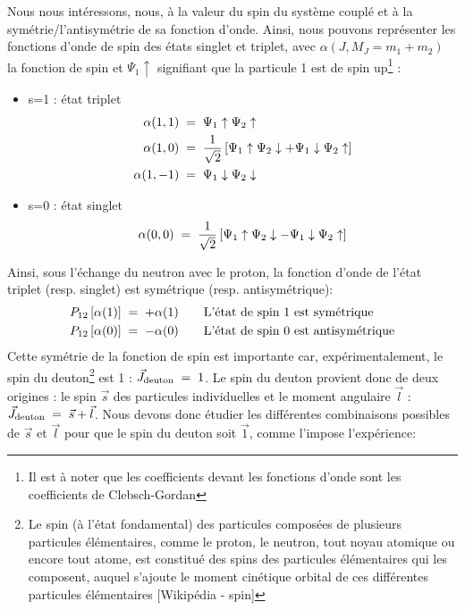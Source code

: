 Nous nous intéressons, nous, à la valeur du spin du système couplé et à la symétrie/l'antisymétrie de sa fonction d'onde. Ainsi, nous pouvons représenter les fonctions d'onde de spin des états singlet et triplet, avec $\alpha(J,M_J=m_1+m_2)$ la fonction de spin et $\Psi_1\uparrow$ signifiant que la particule 1 est de spin up\footnote{Il est à noter que les coefficients devant les fonctions d'onde sont les coefficients de Clebsch-Gordan} :
\begin{itemize}
    \item s=1 : état triplet
    \begin{align*}
        \alpha (1,1)  &\; = \; \Psi_1\uparrow \Psi_2\uparrow \\
        \alpha (1,0)  &\; = \;  \dfrac{1}{\sqrt{2}} \left[ \Psi_1\uparrow\Psi_2\downarrow +  \Psi_1\downarrow\Psi_2\uparrow\right]\\
        \alpha (1,-1) &\; = \; \Psi_1\downarrow\Psi_2\downarrow
    \end{align*}
    \item s=0 : état singlet
    \begin{equation}
        \alpha (0,0)  \; = \;  \dfrac{1}{\sqrt{2}} \left[ \Psi_1\uparrow\Psi_2\downarrow -  \Psi_1\downarrow\Psi_2\uparrow\right]
    \end{equation}
\end{itemize}
Ainsi, sous l'échange du neutron avec le proton, la fonction d'onde de l'état triplet (resp. singlet) est symétrique (resp. antisymétrique):
\begin{align*}
    P_{12} \left[ \alpha(1) \right] &\; = \; +\alpha(1) \qquad \text{L'état de spin 1 est symétrique}\\
    P_{12} \left[ \alpha(0) \right] &\; = \; -\alpha(0) \qquad \text{L'état de spin 0 est antisymétrique}
\end{align*}
Cette symétrie de la fonction de spin est importante car, expérimentalement, le spin du deuton\footnote{Le spin (à l'état fondamental) des particules composées de plusieurs particules élémentaires, comme le proton, le neutron, tout noyau atomique ou encore tout atome, est constitué des spins des particules élémentaires qui les composent, auquel s'ajoute le moment cinétique orbital de ces différentes particules élémentaires [Wikipédia - spin]} est 1 : $\vec{J}_{\text{deuton}} \; = \; 1$. Le spin du deuton provient donc de deux origines : le spin $\vec{s}$ des particules individuelles et le moment angulaire $\vec{l}$ : $\vec{J}_{\text{deuton}} \; = \; \vec{s}+\vec{l}$. Nous devons donc étudier les différentes combinaisons possibles de $\vec{s}$ et $\vec{l}$ pour que le spin du deuton soit $\vec{1}$, comme l'impose l'expérience:
